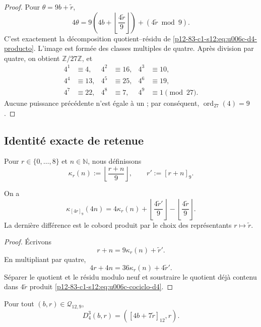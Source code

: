 \begin{proof}
Pour \(\theta=9b+\widetilde r\),
\[
 4\theta
 =9\left(
  4b+\left\lfloor\frac{4\widetilde r}{9}\right\rfloor
 \right)
 +(4\widetilde r\bmod9).
\]
C’est exactement la décomposition quotient--résidu de
\eqref{p12-83-c1-s12:eq:u006c-d4-producto}. L’image est formée des classes
multiples de quatre. Après division par quatre, on obtient
\(\mathbb Z/27\mathbb Z\), et
\[
\begin{aligned}
 4^1&\equiv4,& 4^2&\equiv16,& 4^3&\equiv10,\\
 4^4&\equiv13,& 4^5&\equiv25,& 4^6&\equiv19,\\
 4^7&\equiv22,& 4^8&\equiv7,& 4^9&\equiv1\pmod{27}.
\end{aligned}
\]
Aucune puissance précédente n’est égale à un ; par conséquent,
\(\operatorname{ord}_{27}(4)=9\).
\end{proof}

\subsection{Identité exacte de retenue}

Pour \(r\in\{0,\ldots,8\}\) et \(n\in\mathbb N\), nous définissons
\[
 \kappa_r(n):=\left\lfloor\frac{r+n}{9}\right\rfloor,
 \qquad
 r':=[r+n]_9.
\]

\begin{theorem}
\label{p12-83-c1-s12:thm:u006c-cociclo-d4}
On a
\begin{equation}
 \boxed{
 \kappa_{[4r]_9}(4n)
 =4\kappa_r(n)
 +\left\lfloor\frac{4\widetilde r'}{9}\right\rfloor
 -\left\lfloor\frac{4\widetilde r}{9}\right\rfloor.}
 \label{p12-83-c1-s12:eq:u006c-cociclo-d4}
\end{equation}
La dernière différence est le cobord produit par le choix des
représentants \(r\mapsto\widetilde r\).
\end{theorem}

\begin{proof}
Écrivons
\[
 r+n=9\kappa_r(n)+\widetilde r'.
\]
En multipliant par quatre,
\[
 4r+4n=36\kappa_r(n)+4\widetilde r'.
\]
Séparer le quotient et le résidu modulo neuf et soustraire le quotient déjà contenu dans
\(4\widetilde r\) produit
\eqref{p12-83-c1-s12:eq:u006c-cociclo-d4}.
\end{proof}

\begin{corollary}
\label{p12-83-c1-s12:cor:u006c-tercera-iteracion}
Pour tout \((b,r)\in\mathcal Q_{12,9}\),
\begin{equation}
 \boxed{D_4^3(b,r)=([4b+7\widetilde r]_{12},r).}
 \label{p12-83-c1-s12:eq:u006c-d4-cubo}
\end{equation}
\end{corollary}


